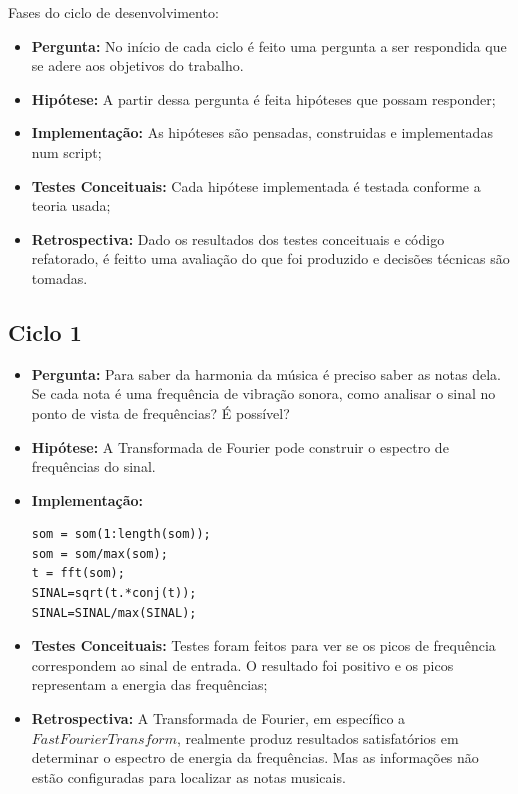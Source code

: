 Fases do ciclo de desenvolvimento:
\begin{itemize}
\item \textbf{Pergunta:} No início de cada ciclo é feito uma pergunta a ser respondida que se adere aos objetivos do trabalho.
\item \textbf{Hipótese:} A partir dessa pergunta é feita hipóteses que possam responder;
\item \textbf{Implementação:} As hipóteses são pensadas, construidas e implementadas num script;
\item \textbf{Testes Conceituais:} Cada hipótese implementada é testada conforme a teoria usada;
\item \textbf{Retrospectiva:} Dado os resultados dos testes conceituais e código refatorado, é feitto uma avaliação do que foi produzido e decisões técnicas são tomadas.
\end{itemize}
  
\subsection{Ciclo 1}
\label{subsec:ciclo_1}

\begin{itemize}
\item \textbf{Pergunta:} Para saber da harmonia da música é preciso saber as notas dela. Se cada nota é uma frequência de vibração sonora, como analisar o sinal no ponto de vista de frequências? É possível?
\item \textbf{Hipótese:} A Transformada de Fourier pode construir o espectro de frequências do sinal.
\item \textbf{Implementação:} 
\begin{lstlisting}
som = som(1:length(som));
som = som/max(som);
t = fft(som);
SINAL=sqrt(t.*conj(t));
SINAL=SINAL/max(SINAL);
\end{lstlisting}
\item \textbf{Testes Conceituais:} Testes foram feitos para ver se os picos de frequência correspondem ao sinal de entrada. O resultado foi positivo e os picos representam a energia das frequências;
\item \textbf{Retrospectiva:} A Transformada de Fourier, em específico a $Fast Fourier Transform$, realmente produz resultados satisfatórios em determinar o espectro de energia da frequências. Mas as informações não estão configuradas para localizar as notas musicais.
\end{itemize}


